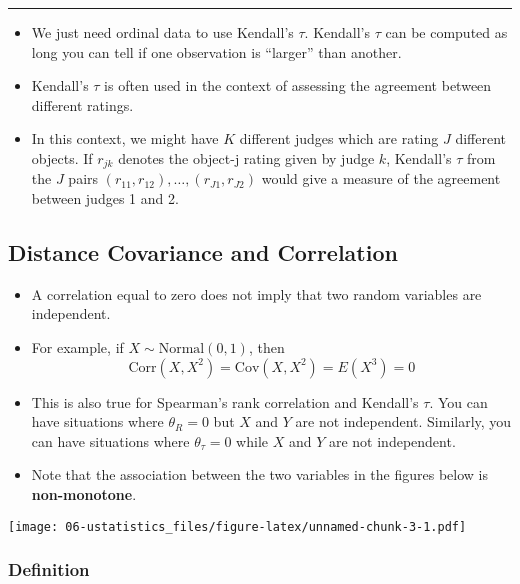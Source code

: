 \documentclass[]{book}
\begin{document}
\begin{center}\rule{0.5\linewidth}{\linethickness}\end{center}

\begin{itemize}
\item
  We just need ordinal data to use Kendall's \(\tau\). Kendall's \(\tau\) can be computed
  as long you can tell if one observation is ``larger'' than another.
\item
  Kendall's \(\tau\) is often used in the context of assessing the agreement between
  different ratings.
\item
  In this context, we might have \(K\) different judges which are rating \(J\) different objects.
  If \(r_{jk}\) denotes the object-j rating given by judge \(k\), Kendall's \(\tau\)
  from the \(J\) pairs \((r_{11}, r_{12}), \ldots, (r_{J1}, r_{J2})\) would give
  a measure of the agreement between judges 1 and 2.
\end{itemize}

\hypertarget{distance-covariance-and-correlation}{%
\subsection{Distance Covariance and Correlation}\label{distance-covariance-and-correlation}}

\begin{itemize}
\item
  A correlation equal to zero does not imply that two random variables
  are independent.
\item
  For example, if \(X \sim \textrm{Normal}(0, 1)\), then
  \begin{equation}
  \textrm{Corr}(X, X^{2}) = \textrm{Cov}(X, X^{2}) = E( X^{3} ) = 0 \nonumber
  \end{equation}
\item
  This is also true for Spearman's rank correlation and Kendall's \(\tau\). You
  can have situations where \(\theta_{R} = 0\) but \(X\) and \(Y\) are not independent.
  Similarly, you can have situations where \(\theta_{\tau} = 0\)
  while \(X\) and \(Y\) are not independent.
\item
  Note that the association between the two variables in the figures below
  is \textbf{non-monotone}.
\end{itemize}

\texttt{[image: 06-ustatistics\_files/figure-latex/unnamed-chunk-3-1.pdf]}

\hypertarget{definition-4}{%
\subsubsection{Definition}\label{definition-4}}
\end{document}
